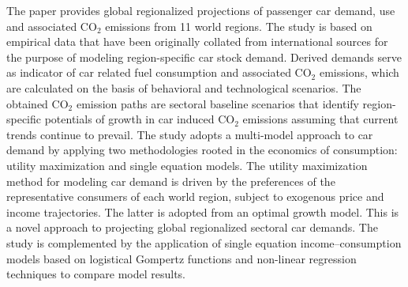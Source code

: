 The paper provides global regionalized projections of passenger car demand, use and associated CO$_2$ emissions from 11 world regions. The study is based on empirical data that have been originally collated from international sources for the purpose of modeling region-specific car stock demand. Derived demands serve as indicator of car related fuel consumption and associated CO$_2$ emissions, which are calculated on the basis of behavioral and technological scenarios. The obtained CO$_2$ emission paths are sectoral baseline scenarios that identify region-specific potentials of growth in car induced CO$_2$ emissions assuming that current trends continue to prevail. The study adopts a multi-model approach to car demand by applying two methodologies rooted in the economics of consumption: utility maximization and single equation models. The utility maximization method for modeling car demand is driven by the preferences of the representative consumers of each world region, subject to exogenous price and income trajectories. The latter is adopted from an optimal growth model. This is a novel approach to projecting global regionalized sectoral car demands. The study is complemented by the application of single equation income–consumption models based on logistical Gompertz functions and non-linear regression techniques to compare model results.
